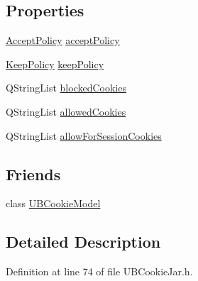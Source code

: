 \subsection*{Properties}
\begin{DoxyCompactItemize}
\item 
\hyperlink{class_u_b_cookie_jar_a56b257f6334659d6cbee56ec159c6e30}{Accept\-Policy} \hyperlink{class_u_b_cookie_jar_ab3f40d275cab52e1927ed806a991584c}{accept\-Policy}
\item 
\hyperlink{class_u_b_cookie_jar_ad4d8ed16fd3d612f015191290e4b3cc5}{Keep\-Policy} \hyperlink{class_u_b_cookie_jar_a89c86e4b360b184c0ffd6f00e49c0458}{keep\-Policy}
\item 
Q\-String\-List \hyperlink{class_u_b_cookie_jar_ac3cce1bd05d14c83b8f14c7220229679}{blocked\-Cookies}
\item 
Q\-String\-List \hyperlink{class_u_b_cookie_jar_ad87bcda47828dbca15535bcbb01d17e8}{allowed\-Cookies}
\item 
Q\-String\-List \hyperlink{class_u_b_cookie_jar_adb923c38e38411c8cb1ae9d87ada66f2}{allow\-For\-Session\-Cookies}
\end{DoxyCompactItemize}
\subsection*{Friends}
\begin{DoxyCompactItemize}
\item 
class \hyperlink{class_u_b_cookie_jar_a7f691c55380714fa80806552ef19dd61}{U\-B\-Cookie\-Model}
\end{DoxyCompactItemize}


\subsection{Detailed Description}


Definition at line 74 of file U\-B\-Cookie\-Jar.\-h.



